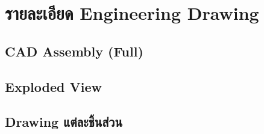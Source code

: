 
\appendix


\section{รายละเอียด Engineering Drawing}
\label{app:drawings}

\subsection{CAD Assembly (Full)}
\label{subsec:cad_assembly}


\subsection{Exploded View}
\label{subsec:exploded_view}


\subsection{Drawing แต่ละชิ้นส่วน}
\label{subsec:part_drawings}

